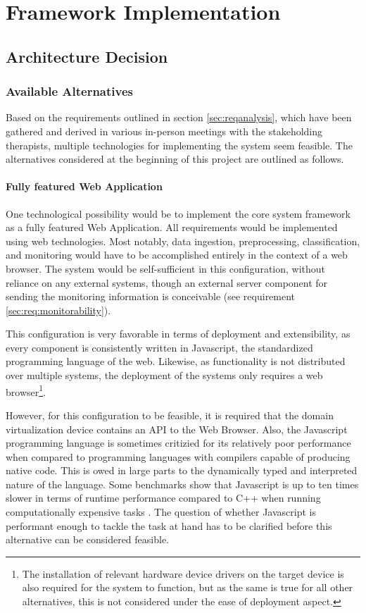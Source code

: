 \chapter{Framework Implementation}
\label{sec:impl}
\section{Architecture Decision}
\subsection{Available Alternatives}
Based on the requirements outlined in section \ref{sec:reqanalysis}, which have been gathered and derived in various in-person meetings with the stakeholding therapists, multiple technologies for implementing the system seem feasible. The alternatives considered at the beginning of this project are outlined as follows.

\subsubsection{Fully featured Web Application}
\label{sec:alt:fully-featured-web-app}
One technological possibility would be to implement the core system framework as a fully featured Web Application. All requirements would be implemented using web technologies. Most notably, data ingestion, preprocessing, classification, and monitoring would have to be accomplished entirely in the context of a web browser. The system would be self-sufficient in this configuration, without reliance on any external systems, though an external server component for sending the monitoring information is conceivable (see requirement \ref{sec:req:monitorability}).

This configuration is very favorable in terms of deployment and extensibility, as every component is consistently written in Javascript, the standardized programming language of the web. Likewise, as functionality is not distributed over multiple systems, the deployment of the systems only requires a web browser\footnote{The installation of relevant hardware device drivers on the target device is also required for the system to function, but as the same is true for all other alternatives, this is not considered under the ease of deployment aspect.}.

However, for this configuration to be feasible, it is required that the domain virtualization device contains an API to the Web Browser. Also, the Javascript programming language is sometimes critizied for its relatively poor performance when compared to programming languages with compilers capable of producing native code. This is owed in large parts to the dynamically typed and interpreted nature of the language. Some benchmarks show that Javascript is up to ten times slower in terms of runtime performance compared to C++ when running computationally expensive tasks \cite{BenchmarksGame}. The question of whether Javascript is performant enough to tackle the task at hand has to be clarified before this alternative can be considered feasible.
